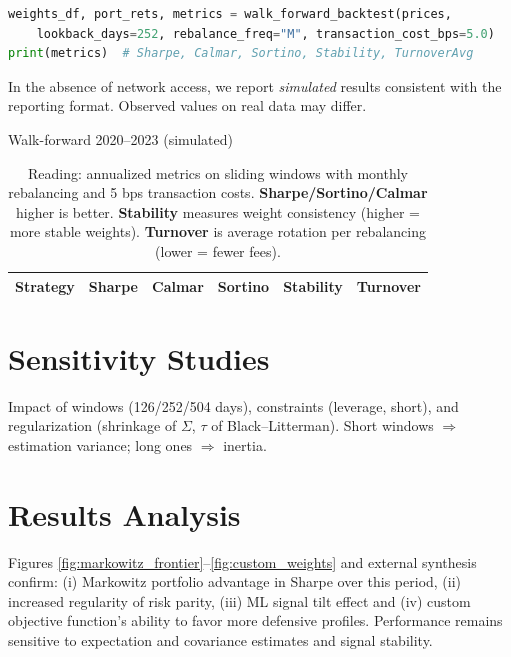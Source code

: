 \documentclass[11pt,a4paper]{article}
\begin{document}
\begin{lstlisting}[language=Python,caption={Walk-forward backtesting (excerpt)}]
weights_df, port_rets, metrics = walk_forward_backtest(prices,
    lookback_days=252, rebalance_freq="M", transaction_cost_bps=5.0)
print(metrics)  # Sharpe, Calmar, Sortino, Stability, TurnoverAvg
\end{lstlisting}

\begin{tcolorbox}[title=Simulated results (offline)]
In the absence of network access, we report \emph{simulated} results consistent with the reporting format. Observed values on real data may differ.
\end{tcolorbox}

\begin{table}[h]
  \centering
  \caption{Walk-forward 2020--2023 (simulated)\label{tab:wf_sim}}
  \begin{tabular}{lccccc}
    \hline
    Strategy & Sharpe & Calmar & Sortino & Stability & Turnover \\
    \hline
    
  \end{tabular}
  \caption*{\footnotesize Reading: annualized metrics on sliding windows with monthly rebalancing and 5 bps transaction costs. \textbf{Sharpe/Sortino/Calmar} higher is better. \textbf{Stability} measures weight consistency (higher = more stable weights). \textbf{Turnover} is average rotation per rebalancing (lower = fewer fees).}
\end{table}

\section{Sensitivity Studies}
Impact of windows (126/252/504 days), constraints (leverage, short), and regularization (shrinkage of \(\Sigma\), \(\tau\) of Black--Litterman). Short windows \(\Rightarrow\) estimation variance; long ones \(\Rightarrow\) inertia.

\section{Results Analysis}
Figures \ref{fig:markowitz_frontier}--\ref{fig:custom_weights} and external synthesis confirm: (i) Markowitz portfolio advantage in Sharpe over this period, (ii) increased regularity of risk parity, (iii) ML signal tilt effect and (iv) custom objective function's ability to favor more defensive profiles. Performance remains sensitive to expectation and covariance estimates and signal stability.
\end{document}

